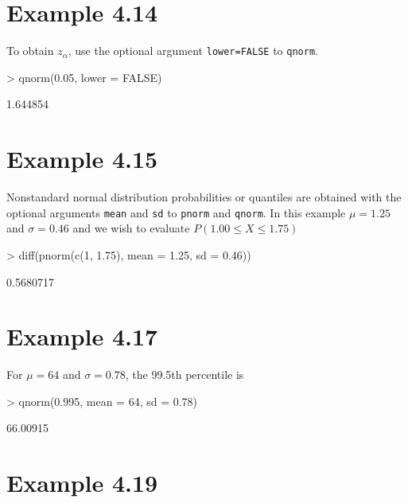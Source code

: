 \documentclass{book}
\begin{document}
\section{Example 4.14}
\label{sec:xmp0414}

To obtain $z_\alpha$, use the optional argument \texttt{lower=FALSE}
to \texttt{qnorm}.
\begin{Schunk}
\begin{Sinput}
> qnorm(0.05, lower = FALSE)
\end{Sinput}
\begin{Soutput}
[1] 1.644854
\end{Soutput}
\end{Schunk}

\section{Example 4.15}
\label{sec:xmp0415}

Nonstandard normal distribution probabilities or quantiles are
obtained with the optional arguments \texttt{mean} and \texttt{sd} to
\texttt{pnorm} and \texttt{qnorm}.  In this example $\mu=1.25$ and
$\sigma=0.46$ and we wish to evaluate $P(1.00\le X\le 1.75)$
\begin{Schunk}
\begin{Sinput}
> diff(pnorm(c(1, 1.75), mean = 1.25, sd = 0.46))
\end{Sinput}
\begin{Soutput}
[1] 0.5680717
\end{Soutput}
\end{Schunk}


\section{Example 4.17}
\label{sec:xmp0417}

For $\mu=64$ and $\sigma=0.78$, the 99.5th percentile is
\begin{Schunk}
\begin{Sinput}
> qnorm(0.995, mean = 64, sd = 0.78)
\end{Sinput}
\begin{Soutput}
[1] 66.00915
\end{Soutput}
\end{Schunk}


\section{Example 4.19}
\label{sec:xmp0419}
\end{document}

